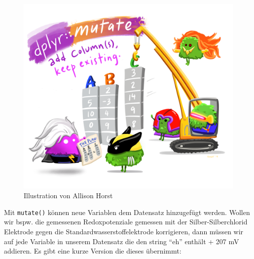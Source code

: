 \documentclass[
]{article}
\begin{document}
\begin{figure}

{\centering \includegraphics[width=1\linewidth]{images/040} 

}

\caption{Illustration von Allison Horst}\label{fig:unnamed-chunk-136}
\end{figure}

Mit \texttt{mutate()} können neue Variablen dem Datensatz hinzugefügt werden. Wollen wir bspw. die gemessenen Redoxpotenziale gemessen mit der Silber-Silberchlorid Elektrode gegen die Standardwasserstoffelektrode korrigieren, dann müssen wir auf jede Variable in unserem Datensatz die den string ``eh'' enthält + 207 mV addieren. Es gibt eine kurze Version die dieses übernimmt:
\end{document}
